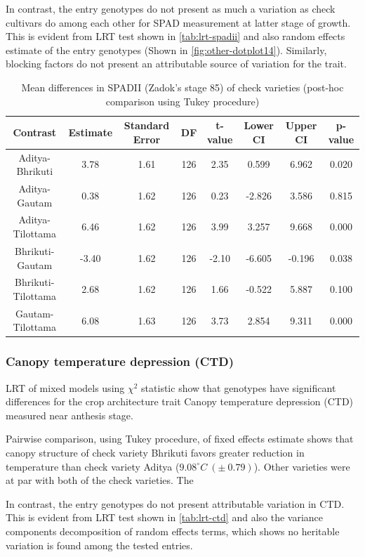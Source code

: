 \documentclass[12pt,oneside]{dukestatscithesis} %
\theoremstyle{definition}
\theoremstyle{definition}
\theoremstyle{definition}
\theoremstyle{remark}
\begin{document}
In contrast, the entry genotypes do not present as much a variation as
check cultivars do among each other for SPAD measurement at latter stage
of growth. This is evident from LRT test shown in \ref{tab:lrt-spadii}
and also random effects estimate of the entry genotypes (Shown in
\ref{fig:other-dotplot14}). Similarly, blocking factors do not present
an attributable source of variation for the trait.
\begin{table}[H]

\caption{\label{tab:other-meanconf-tab4}Mean differences in SPADII (Zadok's stage 85) of check varieties (post-hoc comparison using Tukey procedure)}
\centering
\begin{tabular}[t]{cccccccc}
\toprule
Contrast & Estimate & Standard Error & DF & t-value & Lower CI & Upper CI & p-value\\
\midrule
Aditya-Bhrikuti & 3.78 & 1.61 & 126 & 2.35 & 0.599 & 6.962 & 0.020\\
Aditya-Gautam & 0.38 & 1.62 & 126 & 0.23 & -2.826 & 3.586 & 0.815\\
Aditya-Tilottama & 6.46 & 1.62 & 126 & 3.99 & 3.257 & 9.668 & 0.000\\
Bhrikuti-Gautam & -3.40 & 1.62 & 126 & -2.10 & -6.605 & -0.196 & 0.038\\
Bhrikuti-Tilottama & 2.68 & 1.62 & 126 & 1.66 & -0.522 & 5.887 & 0.100\\
Gautam-Tilottama & 6.08 & 1.63 & 126 & 3.73 & 2.854 & 9.311 & 0.000\\
\bottomrule
\end{tabular}
\end{table}
\subsubsection{Canopy temperature depression
(CTD)}\label{canopy-temperature-depression-ctd}

LRT of mixed models using \(\chi^2\) statistic show that genotypes have
significant differences for the crop architecture trait Canopy
temperature depression (CTD) measured near anthesis stage.

Pairwise comparison, using Tukey procedure, of fixed effects estimate
shows that canopy structure of check variety Bhrikuti favors greater
reduction in temperature than check variety Aditya
(\(9.08^\circ C\ (\pm\ 0.79)\)). Other varieties were at par with both
of the check varieties. The

In contrast, the entry genotypes do not present attributable variation
in CTD. This is evident from LRT test shown in \ref{tab:lrt-ctd} and
also the variance components decomposition of random effects terms,
which shows no heritable variation is found among the tested entries.
\end{document}
